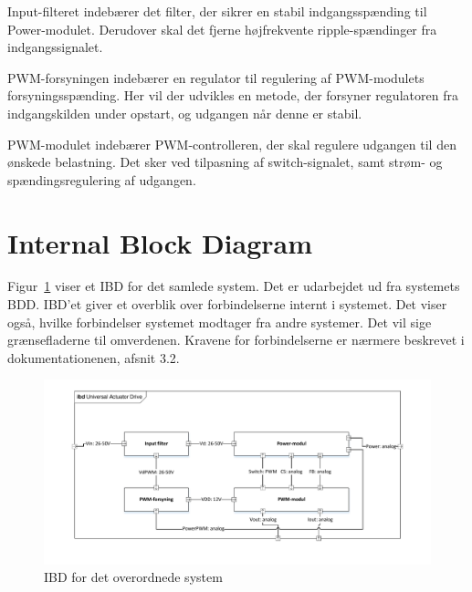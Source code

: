 Input-filteret indebærer det filter, der sikrer en stabil indgangsspænding til Power-modulet. Derudover skal det fjerne højfrekvente ripple-spændinger fra indgangssignalet. 

\noindent PWM-forsyningen indebærer en regulator til regulering af PWM-modulets forsyningsspænding. Her vil der udvikles en metode, der forsyner regulatoren fra indgangskilden under opstart, og udgangen når denne er stabil.

PWM-modulet indebærer PWM-controlleren, der skal regulere udgangen til den ønskede belastning. Det sker ved tilpasning af switch-signalet, samt strøm- og spændingsregulering af udgangen.

\section{Internal Block Diagram}
Figur~\ref{fig:IBD} viser et IBD for det samlede system. Det er udarbejdet ud fra systemets BDD. IBD'et giver et overblik over forbindelserne internt i systemet. Det viser også, hvilke forbindelser systemet modtager fra andre systemer. Det vil sige grænsefladerne til omverdenen. Kravene for forbindelserne er nærmere beskrevet i dokumentationenen, afsnit 3.2.

\begin{figure}[H]
	\centering
	\includegraphics[width=1\linewidth]{../Dokumentation/tex/systemarkitektur/billeder/IBD.pdf}
	\caption{IBD for det overordnede system}
	\label{fig:IBD}
\end{figure}